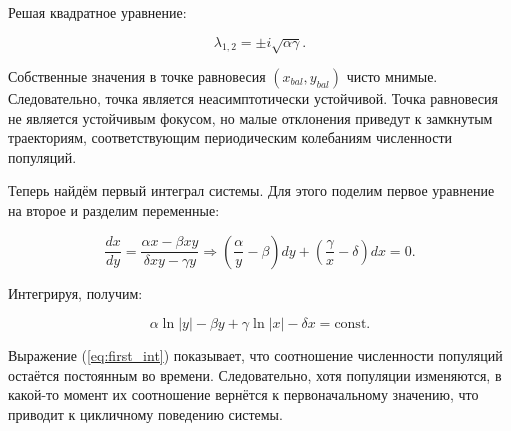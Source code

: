 Решая квадратное уравнение:

\begin{equation}
	\lambda_{1,2} = \pm i \sqrt{\alpha\gamma}.
\end{equation}

Собственные значения в точке равновесия $(x_{bal}, y_{bal})$ чисто мнимые.
Следовательно, точка является неасимптотически устойчивой. Точка равновесия не является устойчивым фокусом, но малые отклонения приведут к замкнутым траекториям, соответствующим периодическим колебаниям численности популяций.

Теперь найдём первый интеграл системы. Для этого поделим первое уравнение на второе и разделим переменные:

\begin{equation} \frac{dx}{dy} = \frac{\alpha x - \beta x y}{\delta x y - \gamma y} \Rightarrow \left(\frac{\alpha}{y} - \beta\right) dy + \left(\frac{\gamma}{x} - \delta\right)dx = 0. \label{eq:diff_FI} \end{equation}

Интегрируя, получим:

\begin{equation} \alpha \ln |y| - \beta y + \gamma \ln |x| - \delta x = \text{const}. \label{eq:first_int} \end{equation}

Выражение (\ref{eq:first_int}) показывает, что соотношение численности популяций остаётся постоянным во времени.
Следовательно, хотя популяции изменяются, в какой-то момент их соотношение вернётся к первоначальному значению, что приводит к цикличному поведению системы.